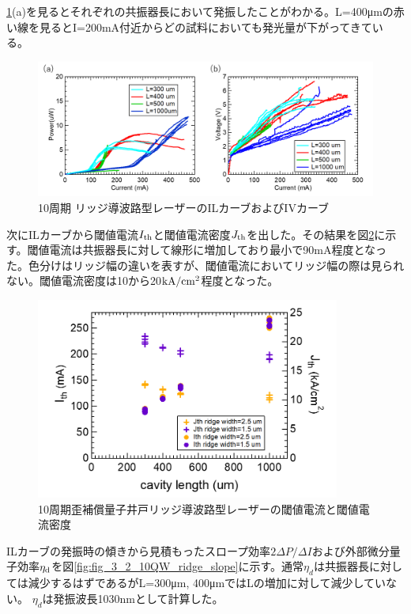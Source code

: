 {\ref{fig:fig_3_2_10QW_ridge_IL}(a)を見るとそれぞれの共振器長において発振したことがわかる。L=400\si{\micro\metre}の赤い線を見るとI=200mA付近からどの試料においても発光量が下がってきている。
\begin{figure}[h]
	\centering
	\includegraphics[width=15cm]{figure/fig_3_2_10QW_ridge_IL.png}
		\caption{10周期 リッジ導波路型レーザーのILカーブおよびIVカーブ}
		\label{fig:fig_3_2_10QW_ridge_IL}
\end{figure}
次にILカーブから閾値電流$I_{\rm{th}}$と閾値電流密度$J_{\rm{th}}$を出した。その結果を図\ref{fig:fig_3_2_10QW_ridge_Ith}に示す。閾値電流は共振器長に対して線形に増加しており最小で90mA程度となった。色分けはリッジ幅の違いを表すが、閾値電流においてリッジ幅の際は見られない。閾値電流密度は10から20$\rm{kA/cm^{2}}$程度となった。
\begin{figure}[h]
	\centering
	\includegraphics[width=10cm]{figure/fig_3_2_10QW_ridge_Ith.png}
		\caption{10周期歪補償量子井戸リッジ導波路型レーザーの閾値電流と閾値電流密度}
		\label{fig:fig_3_2_10QW_ridge_Ith}
\end{figure}
ILカーブの発振時の傾きから見積もったスロープ効率$2\Delta P/\Delta I$および外部微分量子効率$\eta_{\rm{d}}$を図\ref{fig:fig_3_2_10QW_ridge_slope}に示す。通常$\eta_{d}$は共振器長に対しては減少するはずであるがL=300\si{\micro\metre}, 400\si{\micro\metre}ではLの増加に対して減少していない。
$\eta_{d}$は発振波長1030nmとして計算した。
}
